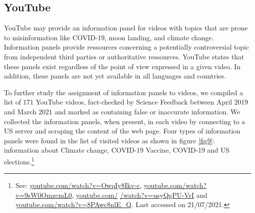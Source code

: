 \documentclass{article}
\begin{document}
\subsection{YouTube} \label{youtube_panels}

YouTube may provide an information panel for videos with topics that are prone to misinformation like COVID-19, moon landing, and climate change. Information panels provide ressources concerning a potentially controversial topic from independent third parties or authoritative ressources. YouTube states that these panels exist regardless of the point of view expressed in a given video. In addition, these panels are not yet available in all languages and countries. %

\smallskip

To further study the assignment of information panels to videos, we compiled a list of $171$ YouTube videos, fact-checked by Science Feedback between April $2019$ and March $2021$ and marked as containing false or inaccurate information. We collected the information panels, when present, in each video by connecting to a US server and scraping the content of the web page. Four types of information panels were found in the list of visited videos as shown in figure \ref{fig9}:  information about Climate change, COVID-19 Vaccine, COVID-19 and US elections.\footnote{See: \href{https://www.youtube.com/watch?v=OwqIy8Ikv-c}{youtube.com/watch?v=OwqIy8Ikv-c}, \href{https://www.youtube.com/watch?v=9sW0OmzcmL0}{youtube.com/watch?v=9sW0OmzcmL0}, \href{https://www.youtube.com/watch?v=usyQgPU-VrI}{youtube.com/} \href{https://www.youtube.com/watch?v=usyQgPU-VrI}{/watch?v=usyQgPU-VrI} and \href{https://www.youtube.com/watch?v=8PAwc8nlE\_Q}{youtube.com/watch?v=8PAwc8nlE\_Q}. Last accessed on  21/07/2021.  }
\end{document}
